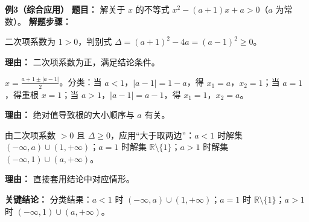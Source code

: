\begin{examplebox}
	\medskip
	\textbf{\textcolor{CExample}{例3（综合应用）}}
	\textbf{\textcolor{CExample}{题目：}}
	解关于 $x$ 的不等式 $x^2-(a+1)x+a>0$（$a$ 为常数）。
	\textbf{\textcolor{CExample}{解题步骤：}}
	\begin{description}[style=nextline, leftmargin=2.8em, labelsep=0.5em, itemsep=0.45em]
		\item[\textbf{第一步（识别参数）：}]
			二次项系数为 $1>0$，判别式 $\Delta=(a+1)^2-4a=(a-1)^2\ge0$。
			\par\textbf{理由：} 二次项系数为正，满足结论条件。
		\item[\textbf{第二步（求根与分类）：}]
			$x=\frac{a+1\pm|a-1|}{2}$。分类：当 $a<1$，$|a-1|=1-a$，得 $x_1=a$，$x_2=1$；当 $a=1$，得重根 $x=1$；当 $a>1$，$|a-1|=a-1$，得 $x_1=1$，$x_2=a$。
			\par\textbf{理由：} 绝对值导致根的大小顺序与 $a$ 有关。
		\item[\textbf{第三步（套结论）：}]
			由二次项系数 $>0$ 且 $\Delta\ge0$，应用“大于取两边”：$a<1$ 时解集 $(-\infty,a)\cup(1,+\infty)$；$a=1$ 时解集 $\mathbb{R}\setminus\lbrace1\rbrace$；$a>1$ 时解集 $(-\infty,1)\cup(a,+\infty)$。
			\par\textbf{理由：} 直接套用结论中对应情形。
	\end{description}
	\textbf{\textcolor{CExample}{关键结论：}}
	分类结果：$a<1$ 时 $(-\infty,a)\cup(1,+\infty)$；$a=1$ 时 $\mathbb{R}\setminus\lbrace1\rbrace$；$a>1$ 时 $(-\infty,1)\cup(a,+\infty)$。
\end{examplebox}
